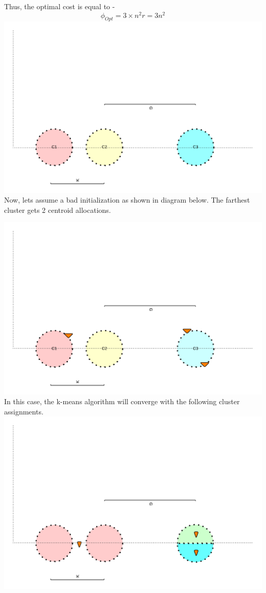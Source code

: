 \documentclass[11pt]{article}
\begin{document}
{Thus, the optimal cost is equal to -
$$\phi_{Opt} = 3 \times n^2 r = 3n^2$$
\includegraphics[scale=0.8]{q3_1} \\

Now, lets assume a bad initialization as shown in diagram below. The farthest cluster gets 2 centroid allocations.

\includegraphics[scale=0.8]{q3_2} \\

In this case, the k-means algorithm will converge with the following cluster assignments.\\
\includegraphics[scale=0.8]{q3_3} \\

}
\end{document}
